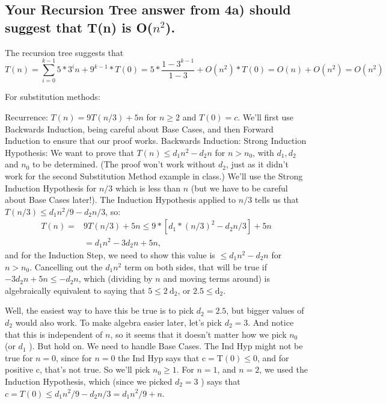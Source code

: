 \documentclass[a4paper]{article}
\begin{document}
\subsection{Your Recursion Tree answer from 4a) should suggest that T(n) is O($n^2$).}
The recursion tree suggests that 
$$T(n)=\sum^{k-1}_{i=0} 5*3^i n + 9^{k-1}*T(0)=5*\frac{1-3^{k-1}}{1-3} +O(n^2)*T(0)=O(n)+O(n^2)=O(n^2)$$ 

For substitution methods:

Recurrence: $T(n)=9 T(n / 3)+5 n$ for $n \geq 2$ and $T(0)=c$. We'll first use Backwards Induction, being careful about Base Cases, and then Forward Induction to ensure that our proof works.
Backwards Induction: Strong Induction Hypothesis: We want to prove that $T(n) \leq d_1 n^2-d_2 n$ for $n>n_0$, with $d_1, d_2$ and $n_0$ to be determined. (The proof won't work without $d_2$, just as it didn't work for the second Substitution Method example in class.)
We'll use the Strong Induction Hypothesis for $n / 3$ which is less than $n$ (but we have to be careful about Base Cases later!). The Induction Hypothesis applied to $n / 3$ tells us that $T(n / 3) \leq d_1 n^2 / 9-d_2 n / 3$, so:
$$
\begin{aligned}
T(n)=& 9 T(n / 3)+5 n \leq 9 *\left[d_1 *(n / 3)^2-d_2 n / 3\right]+5 n \\
&=d_1 n^2-3 d_2 n+5 n,
\end{aligned}
$$
and for the Induction Step, we need to show this value is $\leq d_1 n^2-d_2 n$ for $n>n_0$.
Cancelling out the $d_1 n^2$ term on both sides, that will be true if $-3 d_2 n+5 n \leq-d_2 n$, which (dividing by $n$ and moving terms around) is algebraically equivalent to saying that $5 \leq 2 \mathrm{~d}_2$, or $2.5 \leq \mathrm{d}_2$.

Well, the easiest way to have this be true is to pick $d_2=2.5$, but bigger values of $d_2$ would also work. To make algebra easier later, let's pick $d_2=3$. And notice that this is independent of $n$, so it seems that it doesn't matter how we pick $n_0$ (or $d_1$ ). But hold on. We need to handle Base Cases.
The Ind Hyp might not be true for $n=0$, since for $n=0$ the Ind Hyp says that $\mathrm{c}=\mathrm{T}(0) \leq 0$, and for positive $\mathrm{c}$, that's not true. So we'll pick $n_0 \geq 1$.
For $n=1$, and $n=2$, we used the Induction Hypothesis, which (since we picked $d_2=3$ ) says that $c=T(0) \leq d_1 n^2 / 9-d_2 n / 3=d_1 n^2 / 9+n$.
\end{document}
